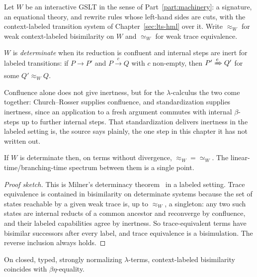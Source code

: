 Let $W$ be an interactive GSLT in the sense of Part~\ref{part:machinery}:
a signature, an equational theory, and rewrite rules whose left-hand
sides are cuts, with the context-labeled transition system of
Chapter~\ref{sec:lts-hml} over it.
Write $\approx_W$ for weak context-labeled bisimilarity on $W$ and
$\simeq_W$ for weak trace equivalence.

\begin{definition}[Determinate]
\label{inh:def:determinate}
$W$ is \emph{determinate} when its reduction is confluent and internal
steps are inert for labeled transitions: if $P \to P'$ and
$P \xrightarrow{c} Q$ with $c$ non-empty, then $P' \xRightarrow{c} Q'$
for some $Q' \approx_W Q$.
\end{definition}

Confluence alone does not give inertness, but for the
$\lambda$-calculus the two come together: Church--Rosser supplies
confluence, and standardization supplies inertness, since an
application to a fresh argument commutes with internal $\beta$-steps up
to further internal steps.
That standardization delivers inertness in the labeled setting is, the
source says plainly, the one step in this chapter it has not written
out.

\begin{proposition}[Collapse]
\label{inh:prop:collapse}
If $W$ is determinate then, on terms without divergence,
$\approx_W = \simeq_W$.
The linear-time/branching-time spectrum between them is a single point.
\end{proposition}

\begin{proof}[Proof sketch]
This is Milner's determinacy theorem~\cite{milnerCC} in a labeled
setting.
Trace equivalence is contained in bisimilarity on determinate systems
because the set of states reachable by a given weak trace is, up to
$\approx_W$, a singleton: any two such states are internal reducts of a
common ancestor and reconverge by confluence, and their labeled
capabilities agree by inertness.
So trace-equivalent terms have bisimilar successors after every label,
and trace equivalence is a bisimulation.
The reverse inclusion always holds.
\end{proof}

\begin{corollary}
\label{inh:cor:lambda}
On closed, typed, strongly normalizing $\lambda$-terms, context-labeled
bisimilarity coincides with $\beta\eta$-equality.
\end{corollary}

